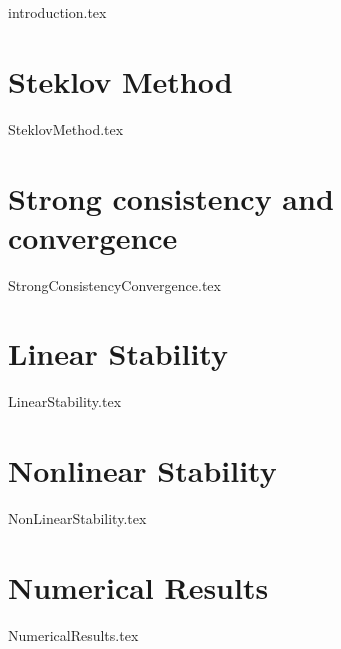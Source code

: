 	\label{paper:paperA}
		{introduction.tex}
	\section{Steklov Method}\label{sec:SteklovMethod}
		{SteklovMethod.tex}
	\section{Strong consistency and convergence}\label{sec:StrongConsistencyAndConvergence}
		{StrongConsistencyConvergence.tex}
	\section{Linear Stability}\label{sec:LinearStability}
		{LinearStability.tex}
	\section{Nonlinear Stability} \label{sec:NonlinearStability}
		{NonLinearStability.tex}
	\section{Numerical Results}\label{sec:NumericalResults}
		{NumericalResults.tex}